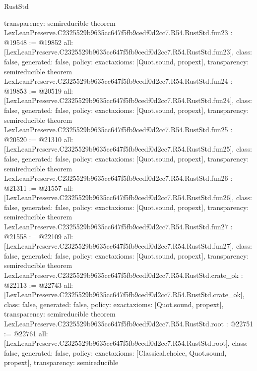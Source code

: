 \begin{lexlean}{RustStd}
\begin{coremodule}
{  transparency: semireducible
}
theorem LexLeanPreserve.C2325529b9635cc647f5fb9cedf0d2cc7.R54.RustStd.fun23 : @19548 := @19852 {
  all: [LexLeanPreserve.C2325529b9635cc647f5fb9cedf0d2cc7.R54.RustStd.fun23],
  class: false,
  generated: false,
  policy: exact{axioms: [Quot.sound, propext]},
  transparency: semireducible
}
theorem LexLeanPreserve.C2325529b9635cc647f5fb9cedf0d2cc7.R54.RustStd.fun24 : @19853 := @20519 {
  all: [LexLeanPreserve.C2325529b9635cc647f5fb9cedf0d2cc7.R54.RustStd.fun24],
  class: false,
  generated: false,
  policy: exact{axioms: [Quot.sound, propext]},
  transparency: semireducible
}
theorem LexLeanPreserve.C2325529b9635cc647f5fb9cedf0d2cc7.R54.RustStd.fun25 : @20520 := @21310 {
  all: [LexLeanPreserve.C2325529b9635cc647f5fb9cedf0d2cc7.R54.RustStd.fun25],
  class: false,
  generated: false,
  policy: exact{axioms: [Quot.sound, propext]},
  transparency: semireducible
}
theorem LexLeanPreserve.C2325529b9635cc647f5fb9cedf0d2cc7.R54.RustStd.fun26 : @21311 := @21557 {
  all: [LexLeanPreserve.C2325529b9635cc647f5fb9cedf0d2cc7.R54.RustStd.fun26],
  class: false,
  generated: false,
  policy: exact{axioms: [Quot.sound, propext]},
  transparency: semireducible
}
theorem LexLeanPreserve.C2325529b9635cc647f5fb9cedf0d2cc7.R54.RustStd.fun27 : @21558 := @22109 {
  all: [LexLeanPreserve.C2325529b9635cc647f5fb9cedf0d2cc7.R54.RustStd.fun27],
  class: false,
  generated: false,
  policy: exact{axioms: [Quot.sound, propext]},
  transparency: semireducible
}
theorem LexLeanPreserve.C2325529b9635cc647f5fb9cedf0d2cc7.R54.RustStd.crate_ok : @22113 := @22743 {
  all: [LexLeanPreserve.C2325529b9635cc647f5fb9cedf0d2cc7.R54.RustStd.crate_ok],
  class: false,
  generated: false,
  policy: exact{axioms: [Quot.sound, propext]},
  transparency: semireducible
}
theorem LexLeanPreserve.C2325529b9635cc647f5fb9cedf0d2cc7.R54.RustStd.root : @22751 := @22761 {
  all: [LexLeanPreserve.C2325529b9635cc647f5fb9cedf0d2cc7.R54.RustStd.root],
  class: false,
  generated: false,
  policy: exact{axioms: [Classical.choice, Quot.sound, propext]},
  transparency: semireducible
}


\end{coremodule}
\end{lexlean}
